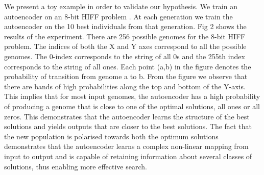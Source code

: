 \documentclass[runningheads,a4paper]{llncs}
\begin{document}

We present a toy example in order to validate our hypothesis. We train an autoencoder on an 8-bit HIFF problem \cite{Watson}. At each generation we train the autoencoder on the 10 best individuals from that generation. Fig 2 shows the results of the experiment. There are 256 possible genomes for the 8-bit HIFF problem. The indices of both the X and Y axes correspond to all the possible genomes. The 0-index corresponds to the string of all 0s and the 255th index corresponds to the string of all ones. Each point (a,b) in the figure denotes the probability of transition from genome a to b. From the figure we observe that there are bands of high probabilities along the top and bottom of the Y-axis. This implies that for most input genomes, the autoencoder has a high probability of producing a genome that is close to one of the optimal solutions, all ones or all zeros. This demonstrates that the autoencoder learns the structure of the best solutions and yields outputs that are closer to the best solutions. The fact that the new population is polarised towards both the optimum solutions demonstrates that the autoencoder learns a complex non-linear mapping from input to output and is capable of retaining information about several classes of solutions, thus enabling more effective search.  
\end{document}

